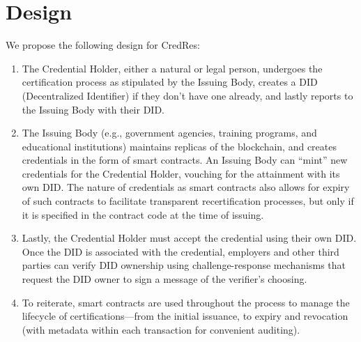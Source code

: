 \section{Design}

We propose the following design for CredRes:
\begin{enumerate}
    \item The Credential Holder, either a natural or legal person, undergoes the certification process as stipulated by the Issuing Body, creates a DID (Decentralized Identifier) if they don’t have one already, and lastly reports to the Issuing Body with their DID.
    \item The Issuing Body (e.g., government agencies, training programs, and educational institutions) maintains replicas of the blockchain, and creates credentials in the form of smart contracts. An Issuing Body can “mint” new credentials for the Credential Holder, vouching for the attainment with its own DID. The nature of credentials as smart contracts also allows for expiry of such contracts to facilitate transparent recertification processes, but only if it is specified in the contract code at the time of issuing.
    \item Lastly, the Credential Holder must accept the credential using their own DID. Once the DID is associated with the credential, employers and other third parties can verify DID ownership using challenge-response mechanisms that request the DID owner to sign a message of the verifier’s choosing.
    \item To reiterate, smart contracts are used throughout the process to manage the lifecycle of certifications—from the initial issuance, to expiry and revocation (with metadata within each transaction for convenient auditing).
\end{enumerate}

